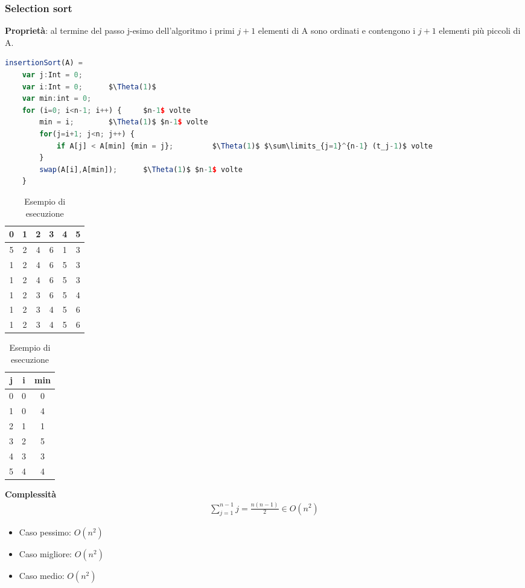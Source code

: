 \subsubsection{Selection sort}
\textbf{Proprietà}: al termine del passo j-esimo dell'algoritmo i primi $j+1$ elementi di A sono ordinati e contengono i $j+1$ elementi più piccoli di A.
\begin{lstlisting}[language=Javascript, caption=Algoritmo selection sort, mathescape=true]
	insertionSort(A) =
	var j:Int = 0;
	var i:Int = 0;		$\Theta(1)$
	var min:int = 0;
	for (i=0; i<n-1; i++) {		$n-1$ volte
		min = i;		$\Theta(1)$ $n-1$ volte
		for(j=i+1; j<n; j++) {
			if A[j] < A[min] {min = j};			$\Theta(1)$ $\sum\limits_{j=1}^{n-1} (t_j-1)$ volte
		}
		swap(A[i],A[min]);		$\Theta(1)$ $n-1$ volte
	}
\end{lstlisting}
\begin{table}[h]
	\centering
	\begin{tabular}{ |c|c|c|c|c|c| }
		\hline
		0 & 1 & 2 & 3 & 4 & 5 \\
		\hline
		5 & 2 & 4 & 6 & 1 & 3 \\
		\hline 
		1 & 2 & 4 & 6 & 5 & 3 \\
		\hline 
		1 & 2 & 4 & 6 & 5 & 3 \\
		\hline 
		1 & 2 & 3 & 6 & 5 & 4 \\
		\hline 
		1 & 2 & 3 & 4 & 5 & 6 \\
		\hline 
		1 & 2 & 3 & 4 & 5 & 6 \\
		\hline
	\end{tabular}
	\begin{tabular} { |c|c|c|}
		\hline
		j & i & min \\
		\hline
		0 & 0 & 0 \\
		\hline
		1 & 0 & 4 \\
		\hline
		2 & 1 & 1 \\
		\hline
		3 & 2 & 5 \\
		\hline
		4 & 3 & 3 \\
		\hline
		5 & 4 & 4 \\
		\hline
	\end{tabular}
	\caption{Esempio di esecuzione}
\end{table}
\textbf{Complessità}
\begin{align*}
	\sum\limits_{j=1}^{n-1} j = \frac{n(n-1)}{2} \in O(n^2)
\end{align*}
\begin{itemize}
	\item Caso pessimo: $O(n^2)$
	\item Caso migliore: $O(n^2)$
	\item Caso medio: $O(n^2)$
\end{itemize}
